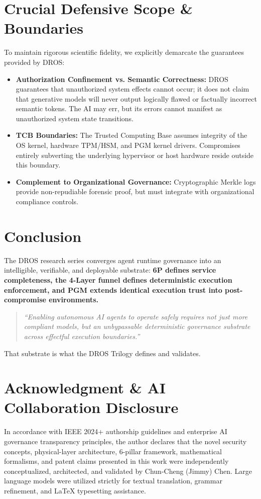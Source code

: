 \documentclass[conference]{IEEEtran}
\begin{document}
\section{Crucial Defensive Scope \& Boundaries}
To maintain rigorous scientific fidelity, we explicitly demarcate the guarantees provided by DROS:
\begin{itemize}
    \item \textbf{Authorization Confinement vs. Semantic Correctness:} DROS guarantees that unauthorized system effects cannot occur; it does not claim that generative models will never output logically flawed or factually incorrect semantic tokens. The AI may err, but its errors cannot manifest as unauthorized system state transitions.
    \item \textbf{TCB Boundaries:} The Trusted Computing Base assumes integrity of the OS kernel, hardware TPM/HSM, and PGM kernel drivers. Compromises entirely subverting the underlying hypervisor or host hardware reside outside this boundary.
    \item \textbf{Complement to Organizational Governance:} Cryptographic Merkle logs provide non-repudiable forensic proof, but must integrate with organizational compliance controls.
\end{itemize}

\section{Conclusion}
The DROS research series converges agent runtime governance into an intelligible, verifiable, and deployable substrate: \textbf{6P defines service completeness, the 4-Layer funnel defines deterministic execution enforcement, and PGM extends identical execution trust into post-compromise environments.}

\begin{quote}
\textit{``Enabling autonomous AI agents to operate safely requires not just more compliant models, but an unbypassable deterministic governance substrate across effectful execution boundaries.''}
\end{quote}
That substrate is what the DROS Trilogy defines and validates.

\section*{Acknowledgment \& AI Collaboration Disclosure}
In accordance with IEEE 2024+ authorship guidelines and enterprise AI governance transparency principles, the author declares that the novel security concepts, physical-layer architecture, 6-pillar framework, mathematical formalisms, and patent claims presented in this work were independently conceptualized, architected, and validated by Chun-Cheng (Jimmy) Chen. Large language models were utilized strictly for textual translation, grammar refinement, and LaTeX typesetting assistance.
\end{document}

